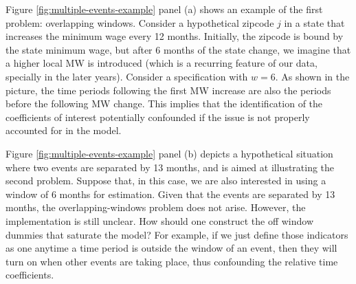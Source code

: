     Figure \ref{fig:multiple-events-example} panel (a) shows an example of the first problem: overlapping windows. Consider a hypothetical zipcode $j$ in a state that increases the minimum wage every 12 months. Initially, the zipcode is bound by the state minimum wage, but after 6 months of the state change, we imagine that a higher local MW is introduced (which is a recurring feature of our data, specially in the later years). Consider a specification with $w = 6$. As shown in the picture, the time periods following the first MW increase are also the periods before the following MW change. This implies that the identification of the coefficients of interest potentially confounded if the issue is not properly accounted for in the model.
    
    Figure \ref{fig:multiple-events-example} panel (b) depicts a hypothetical situation where two events are separated by 13 months, and is aimed at illustrating the second problem. Suppose that, in this case, we are also interested in using a window of 6 months for estimation. Given that the events are separated by 13 months, the overlapping-windows problem does not arise. However, the implementation is still unclear. How should one construct the off window dummies that saturate the model? For example, if we just define those indicators as one anytime a time period is outside the window of an event, then they will turn on when other events are taking place, thus confounding the relative time coefficients.
    
